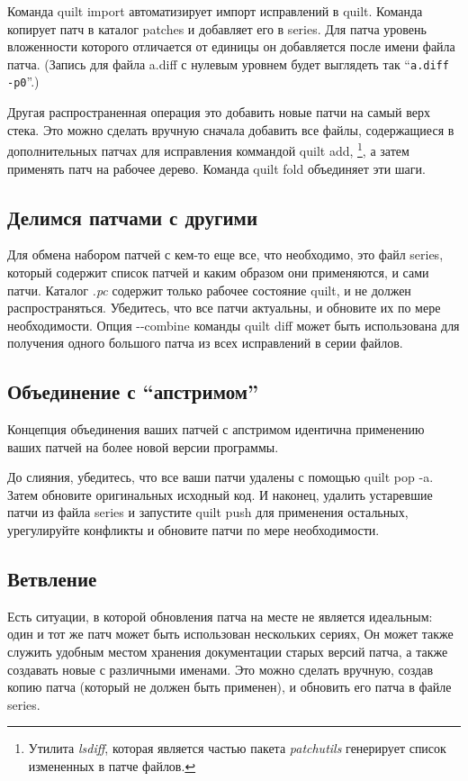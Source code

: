 \documentclass{article}
\newcommand{\quilt}[1]{\textsf{quilt #1}}
\newcommand{\prog}[1]{\textit{#1}}
\begin{document}
Команда \quilt{import} автоматизирует импорт исправлений в quilt. Команда копирует патч в каталог \textsf{patches} и добавляет его в \textsf{series}. Для патча уровень вложенности которого отличается от единицы он добавляется после имени файла патча. (Запись для файла \textsf{a.diff} с нулевым уровнем будет выглядеть так ``{\small \verb|a.diff -p0|}''.)

Другая распространенная операция это добавить новые патчи на самый верх стека. Это можно сделать вручную сначала добавить все файлы, содержащиеся в дополнительных патчах для исправления коммандой \quilt{add}, \footnote{ Утилита \prog{lsdiff}, которая является частью пакета \textit{patchutils} генерирует список измененных в патче файлов.}, а затем применять патч на рабочее дерево. Команда \quilt{fold} объединяет эти шаги.

\subsection{Делимся патчами с другими}

Для обмена набором патчей с кем-то еще все, что необходимо, это файл \textsf{series}, который содержит список патчей и каким образом они применяются, и сами патчи. Каталог \textsl{.pc} содержит только рабочее состояние quilt, и не должен распространяться. Убедитесь, что все патчи актуальны, и обновите их по мере необходимости. Опция \textsf{-{}-combine} команды \quilt{diff} может быть использована для получения одного большого патча из всех исправлений в серии файлов.

\subsection{Объединение с ``апстримом''}

Концепция объединения ваших патчей с апстримом идентична применению ваших патчей на более новой версии программы.

До слияния, убедитесь, что все ваши патчи удалены с помощью \quilt{pop -a}. Затем обновите оригинальных исходный код. И наконец, удалить устаревшие патчи из файла \textsf{series} и запустите \quilt{push} для применения остальных, урегулируйте конфликты и обновите патчи по мере необходимости.

\subsection{Ветвление}
\label{sec:forking}

Есть ситуации, в которой обновления патча на месте не является идеальным: один и тот же патч может быть использован нескольких сериях, Он может также служить удобным местом хранения документации старых версий патча, а также создавать новые с различными именами. Это можно сделать вручную, создав копию патча (который не должен быть применен), и обновить его патча в файле \textsf{series}.
\end{document}
